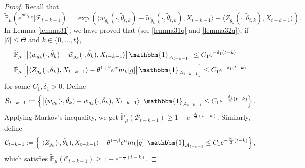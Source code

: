 \documentclass{article}
\begin{document}
\begin{proof}
    Recall that 
    $$\mathbb{\tilde{P}}_{\mu}\left(e^{i\theta \gamma_{t,k}}|\mathcal{F}_{t-k-1}\right)=\exp(\langle w_{g_k}(\cdot,\tilde{\theta}_{t,k})-\tilde{w}_{g_k}(\cdot, \tilde{\theta}_{t,k}),X_{t-k-1}\rangle+\langle Z_{g_k}(\cdot,\tilde{\theta}_{t,k}),X_{t-k-1}\rangle).$$
    In Lemma \ref{lemma31}, we have proved that (see \eqref{lemma31q} and \eqref{lemma32q}), if $|\theta|\leq\Theta$ and $k\in\{0,...,t\}$,
    \begin{align*}
        &\mathbb{\tilde{P}}_{\mu}\left[\left|\langle w_{g_k}(\cdot,\tilde{\theta}_k)-\tilde{w}_{g_k}(\cdot,\tilde{\theta}_k), X_{t-k-1}\rangle\right|\mathbbm{1}_{\mathcal{A}_{t-k-1}}\right]\leq C_1 e^{-\delta_1 (t-k)}\\
        &\mathbb{\tilde{P}}_{\mu}\left[\left|\langle Z_{g_k}(\cdot,\tilde{\theta}_k),X_{t-k-1}\rangle-\theta^{1+\beta}e^{\alpha}m_k[g]\right|\mathbbm{1}_{\mathcal{A}_{t-k-1}}\right]\leq C_1 e^{-\delta_1(t-k)}
    \end{align*}
for some $C_1,\delta_1>0$. Define 
\begin{align*}
    \mathcal{B}_{t-k-1}:=\left\{\left|\langle w_{g_k}(\cdot,\tilde{\theta}_k)-\tilde{w}_{g_k}(\cdot,\tilde{\theta}_k), X_{t-k-1}\rangle\right|\mathbbm{1}_{\mathcal{A}_{t-k-1}}\leq C_1 e^{-\frac{\delta_1}{2}(t-k)}\right\}.
\end{align*}
Applying Markov's inequality, we get $\mathbb{\tilde{P}}_{\mu}(\mathcal{B}_{t-k-1})\geq 1- e^{-\frac{\delta_1}{2}(t-k)}$. Similarly, define
\begin{align*}
    \mathcal{C}_{t-k-1}:=\left\{\left|\langle Z_{g_k}(\cdot,\tilde{\theta}_k),X_{t-k-1}\rangle-\theta^{1+\beta}e^{\alpha}m_k[g]\right|\mathbbm{1}_{\mathcal{A}_{t-k-1}}\leq C_1 e^{-\frac{\delta_1}{2}(t-k)}\right\},
\end{align*}
 which satisfies  $\mathbb{\tilde{P}}_{\mu}(\mathcal{C}_{t-k-1})\geq 1- e^{-\frac{\delta_1}{2}(t-k)}$.


\end{proof}
\end{document}
